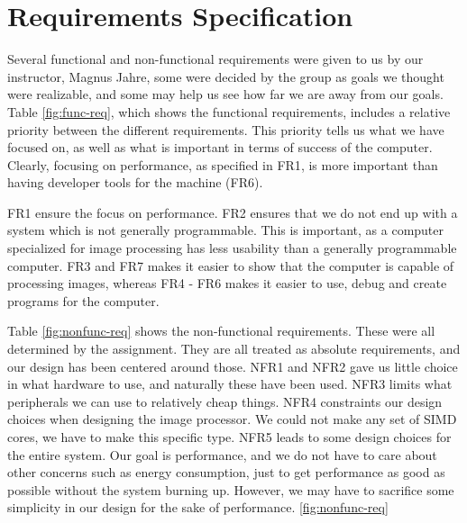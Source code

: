\section{Requirements Specification}

 Several functional
and non-functional requirements were given to us by our instructor, Magnus
Jahre, some were decided by the group as goals we thought were realizable, and
some may help us see how far we are away from our goals. Table
\ref{fig:func-req}, which shows the functional requirements, includes a relative
priority between the different requirements.  This priority tells us what we
have focused on, as well as what is important in terms of success of the
computer. Clearly, focusing on performance, as specified in {\sc FR1}, is more
important than having developer tools for the machine ({\sc FR6}).

{\sc FR1} ensure the focus on performance. {\sc FR2} ensures that we do not end
up with a system which is not generally programmable. This is important, as a
computer specialized for image processing has less usability than a generally
programmable computer. {\sc FR3} and {\sc FR7} makes it easier to show that the
computer is capable of processing images, whereas {\sc FR4 - FR6} makes it
easier to use, debug and create programs for the computer.



Table \ref{fig:nonfunc-req} shows the non-functional requirements. These were
all determined by the assignment. They are all treated as absolute requirements,
and our design has been centered around those. {\sc NFR1} and {\sc NFR2} gave us
little choice in what hardware to use, and naturally these have been used. {\sc
  NFR3} limits what peripherals we can use to relatively cheap
things. {\sc NFR4} constraints our
design choices when designing the image processor. We could not make any set of
SIMD cores, we have to make this specific type. {\sc NFR5} leads to some
design choices for the entire system. Our goal is performance, and we do not
have to care about other concerns such as energy consumption, just to
get performance as good as possible without the system
burning up. However, we may have to sacrifice some simplicity in our design for
the sake of performance.  \ref{fig:nonfunc-req} 
